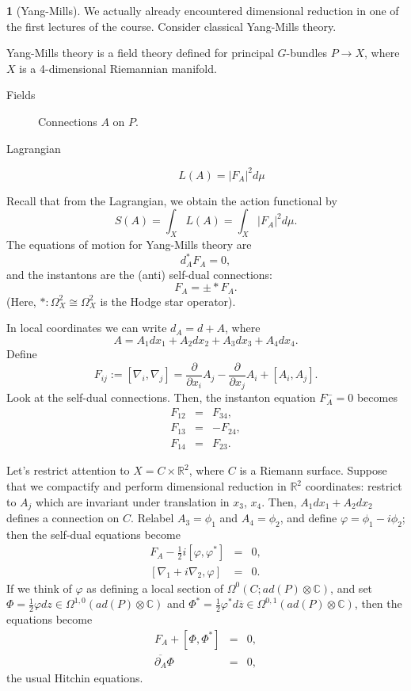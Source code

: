 \documentclass[oneside,english]{amsbook}
\numberwithin{section}{chapter}
\numberwithin{equation}{section}
\numberwithin{figure}{section}
\theoremstyle{plain}
\theoremstyle{definition}
\theoremstyle{remark}
\theoremstyle{definition}
\newtheorem*{example*}{\protect\examplename}
\theoremstyle{definition}
\theoremstyle{plain}
\providecommand{\examplename}{Example}
\begin{document}
\begin{example*}
[Yang-Mills] We actually already encountered dimensional reduction
in one of the first lectures of the course. Consider classical Yang-Mills
theory.

Yang-Mills theory is a field theory defined for principal $G$-bundles
$P\rightarrow X$, where $X$ is a 4-dimensional Riemannian manifold. 
\begin{description}
\item [{Fields}] Connections $A$ on $P$.
\item [{Lagrangian}] 
\[
L\left(A\right)=\left|F_{A}\right|^{2}d\mu
\]

\end{description}
Recall that from the Lagrangian, we obtain the action functional by
\[
S\left(A\right)=\int_{X}L\left(A\right)=\int_{X}\left|F_{A}\right|^{2}d\mu.
\]
The equations of motion for Yang-Mills theory are 
\[
d_{A}^{*}F_{A}=0,
\]
and the instantons are the (anti) self-dual connections: 
\[
F_{A}=\pm*F_{A}.
\]
(Here, $*:\Omega_{X}^{2}\cong\Omega_{X}^{2}$ is the Hodge star operator).

In local coordinates we can write $d_{A}=d+A$, where 
\[
A=A_{1}dx_{1}+A_{2}dx_{2}+A_{3}dx_{3}+A_{4}dx_{4}.
\]
Define 
\[
F_{ij}:=\left[\nabla_{i},\nabla_{j}\right]=\frac{\partial}{\partial x_{i}}A_{j}-\frac{\partial}{\partial x_{j}}A_{i}+\left[A_{i},A_{j}\right].
\]
Look at the self-dual connections. Then, the instanton equation $F_{A}^{-}=0$
becomes 
\begin{eqnarray*}
F_{12} & = & F_{34},\\
F_{13} & = & -F_{24},\\
F_{14} & = & F_{23}.
\end{eqnarray*}


Let's restrict attention to $X=C\times\mathbb{R}^{2}$, where $C$
is a Riemann surface. Suppose that we compactify and perform dimensional
reduction in $\mathbb{R}^{2}$ coordinates: restrict to $A_{j}$ which
are invariant under translation in $x_{3}$, $x_{4}$. Then, $A_{1}dx_{1}+A_{2}dx_{2}$
defines a connection on $C$. Relabel $A_{3}=\phi_{1}$ and $A_{4}=\phi_{2}$,
and define $\varphi=\phi_{1}-i\phi_{2}$; then the self-dual equations
become 
\begin{eqnarray*}
F_{A}-\frac{1}{2}i\left[\varphi,\varphi^{*}\right] & = & 0,\\
\left[\nabla_{1}+i\nabla_{2},\varphi\right] & = & 0.
\end{eqnarray*}
If we think of $\varphi$ as defining a local section of $\Omega^{0}\left(C;ad(P)\otimes\mathbb{C}\right)$,
and set $\Phi=\frac{1}{2}\varphi dz\in\Omega^{1,0}\left(ad\left(P\right)\otimes\mathbb{C}\right)$
and $\Phi^{*}=\frac{1}{2}\varphi^{*}d\overline{z}\in\Omega^{0,1}\left(ad(P)\otimes\mathbb{C}\right)$,
then the equations become 
\begin{eqnarray*}
F_{A}+\left[\Phi,\Phi^{*}\right] & = & 0,\\
\overline{\partial_{A}}\Phi & = & 0,
\end{eqnarray*}
the usual Hitchin equations.
\end{example*}
\end{document}

